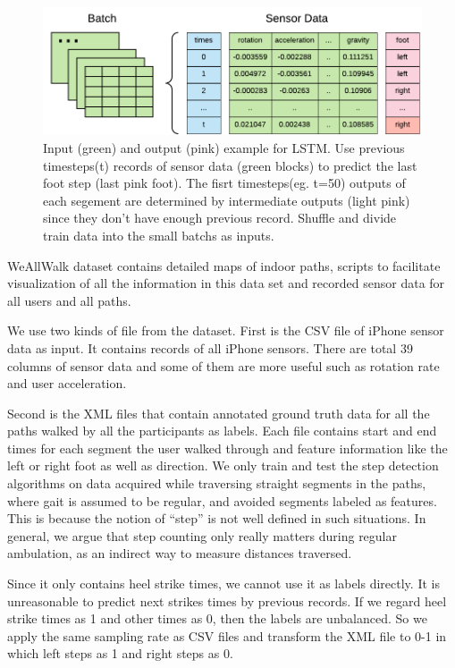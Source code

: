 \documentclass[11pt]{article}
\begin{document}
\begin{figure}[ht]
\centering
\includegraphics[scale=1]{input2}
\caption{Input (green) and output (pink) example for LSTM. Use previous timesteps(t) records of sensor data (green blocks) to predict the last foot step (last pink foot). The fisrt timesteps(eg. t=50) outputs of each segement are determined by intermediate outputs (light pink) since they don't have enough previous record. Shuffle and divide train data into the small batchs as inputs.}
\label{fig:label}
\end{figure}

WeAllWalk dataset contains detailed maps of indoor paths, scripts to facilitate visualization of all the information in this data set and recorded sensor data for all users and all paths.

We use two kinds of file from the dataset. First is the CSV file of iPhone sensor data as input. It contains records of all iPhone sensors. There are total 39 columns of sensor data and some of them are more useful such as rotation rate and user acceleration.

Second is the XML files that contain annotated ground truth data for all the paths walked by all the participants as labels. Each file contains start and end times for each segment the user walked through and feature information like the left or right foot as well as direction. We only train and test the step detection algorithms on data acquired while traversing straight segments in the paths, where gait is assumed to be regular, and avoided segments labeled as features. This is because the notion of “step” is not well defined in such situations. In general, we argue that step counting only really matters during regular ambulation, as an indirect way to measure distances traversed.

Since it only contains heel strike times, we cannot use it as labels directly. It is unreasonable to predict next strikes times by previous records. If we regard heel strike times as 1 and other times as 0, then the labels are unbalanced. So we apply the same sampling rate as CSV files and transform the XML file to 0-1 in which left steps as 1 and right steps as 0.
\end{document}
